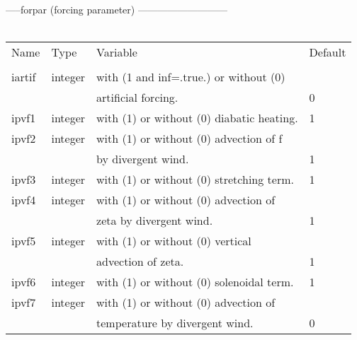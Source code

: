 -----forpar  (forcing parameter) ---------------------------      \\
\\
\begin{tabular}{llll}
Name	&    Type    &	Variable			      &  Default   \\
\\
\hline
iartif	&    integer &  with (1 and inf=.true.) or without (0)&            \\
	&            &  artificial forcing.		      &  0         \\
ipvf1	&    integer &  with (1) or without (0) diabatic heating.& 1       \\
ipvf2	&    integer &  with (1) or without (0) advection of  f            \\
	&	     &  by divergent wind.			& 1        \\
ipvf3	&    integer &	with (1) or without (0) stretching term. & 1       \\
ipvf4	&    integer &	with (1) or without (0) advection of               \\
	&	     &	zeta by divergent wind.			& 1        \\
ipvf5	&    integer &	with (1) or without (0) vertical                   \\
	&            &	advection of zeta.                       & 1       \\
ipvf6	&    integer &	with (1) or without (0) solenoidal term. & 1       \\
ipvf7	&    integer &	with (1) or without (0) advection of               \\
	&            &	temperature by divergent wind.		& 0        \\ \hline
\end{tabular}
\newpage

